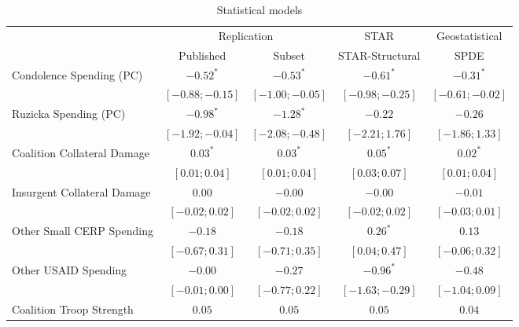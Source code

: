 \documentclass[12pt]{article}
\begin{document}
\begin{table}[!h]
\begin{center}
\begin{footnotesize}
\caption{Statistical models}
\label{table:models}
\begin{tabular}{l c c c c}
\toprule
 & \multicolumn{2}{c}{Replication} & \multicolumn{1}{c}{STAR} & \multicolumn{1}{c}{Geostatistical} \\
\cmidrule(lr){2-3} \cmidrule(lr){4-4} \cmidrule(lr){5-5}
 & Published & Subset & STAR-Structural & SPDE \\
\midrule
Condolence Spending (PC)    & $-0.52^{*}$       & $-0.53^{*}$       & $-0.61^{*}$       & $-0.31^{*}$         \\
                            & $ [-0.88; -0.15]$ & $ [-1.00; -0.05]$ & $ [-0.98; -0.25]$ & $ [ -0.61;  -0.02]$ \\
Ruzicka Spending (PC)       & $-0.98^{*}$       & $-1.28^{*}$       & $-0.22$           & $-0.26$             \\
                            & $ [-1.92; -0.04]$ & $ [-2.08; -0.48]$ & $ [-2.21;  1.76]$ & $ [ -1.86;   1.33]$ \\
Coalition Collateral Damage & $0.03^{*}$        & $0.03^{*}$        & $0.05^{*}$        & $0.02^{*}$          \\
                            & $ [ 0.01;  0.04]$ & $ [ 0.01;  0.04]$ & $ [ 0.03;  0.07]$ & $ [  0.01;   0.04]$ \\
Insurgent Collateral Damage & $0.00$            & $-0.00$           & $-0.00$           & $-0.01$             \\
                            & $ [-0.02;  0.02]$ & $ [-0.02;  0.02]$ & $ [-0.02;  0.02]$ & $ [ -0.03;   0.01]$ \\
Other Small CERP Spending   & $-0.18$           & $-0.18$           & $0.26^{*}$        & $0.13$              \\
                            & $ [-0.67;  0.31]$ & $ [-0.71;  0.35]$ & $ [ 0.04;  0.47]$ & $ [ -0.06;   0.32]$ \\
Other USAID Spending        & $-0.00$           & $-0.27$           & $-0.96^{*}$       & $-0.48$             \\
                            & $ [-0.01;  0.00]$ & $ [-0.77;  0.22]$ & $ [-1.63; -0.29]$ & $ [ -1.04;   0.09]$ \\
Coalition Troop Strength    & $0.05$            & $0.05$            & $0.05$            & $0.04$              \\

\end{tabular}
\end{footnotesize}
\end{center}
\end{table}
\end{document}
